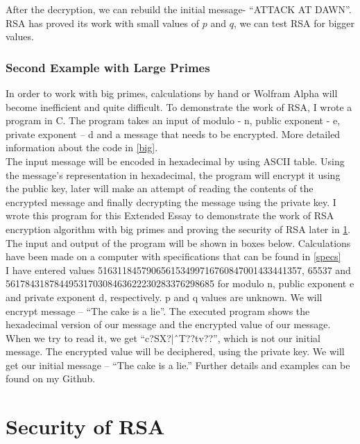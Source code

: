 \documentclass[a4paper, 12pt]{article}
\begin{document}
After the decryption, we can rebuild the initial message- “ATTACK AT DAWN”.
RSA has proved its work with small values of $p$ and $q$, we can test RSA for bigger values.

\subsubsection{Second Example with Large Primes}
\label{bbsec:second}

In order to work with big primes, calculations by hand or Wolfram Alpha will become inefficient
and quite difficult. To demonstrate the work of RSA, I wrote a program in C. 
The program takes an input of modulo - n, public exponent - e, private exponent – d
and a message that needs to be encrypted. More detailed information about the code in
\ref{big}.\\

The input message will be encoded in hexadecimal by using ASCII table. Using
the message’s representation in hexadecimal, the program will encrypt it using the public key, later
will make an attempt of reading the contents of the encrypted message and finally decrypting the
message using the private key. I wrote this program for this Extended Essay to demonstrate the
work of RSA encryption algorithm with big primes and proving the security of RSA later in \ref{sec:security}.
The input and output of the program will be shown in boxes below. Calculations have been
made on a computer with specifications that can be found in \ref{specs}\\

I have entered values 516311845790656153499716760847001433441357, 65537 and
5617843187844953170308463622230283376298685 for modulo n, public exponent e and private
exponent d, respectively. p and q values are unknown. We will encrypt message – “The cake is a
lie”. The executed program shows the hexadecimal version of our message and the encrypted
value of our message. When we try to read it, we get “c?SX?|ˆT??tv??”, which is not our
initial message. The encrypted value will be deciphered, using the private key. We will get our
initial message – “The cake is a lie.” Further details and examples can be found on my Github\cite{github}.\\

\section{Security of RSA}
\label{sec:security}
\end{document}
